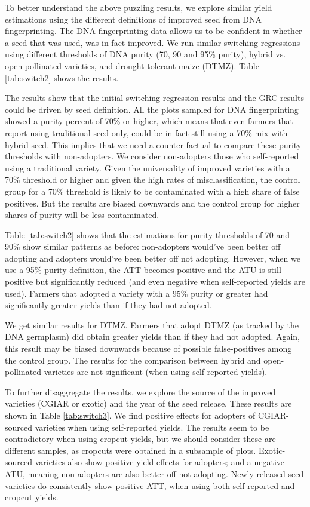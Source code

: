 \documentclass[11pt]{article}
\begin{document}


To better understand the above puzzling results, we explore similar yield estimations using the different definitions of improved seed from DNA fingerprinting. The DNA fingerprinting data allows us to be confident in whether a seed that was used, was in fact improved. We run similar switching regressions using different thresholds of DNA purity (70, 90 and 95\% purity), hybrid vs. open-pollinated varieties, and drought-tolerant maize (DTMZ). Table \ref{tab:switch2} shows the results. 

The results show that the initial switching regression results and the GRC results could be driven by seed definition. All the plots sampled for DNA fingerprinting showed a purity percent of 70\% or higher, which means that even farmers that report using traditional seed only, could be in fact still using a 70\% mix with hybrid seed. This implies that we need a counter-factual to compare these purity thresholds with non-adopters. We consider non-adopters those who self-reported using a traditional variety. Given the universality of improved varieties with a 70\% threshold or higher and given the high rates of misclassification, the control group for a 70\% threshold is likely to be contaminated with a high share of false positives. But the results are biased downwards and the control group for higher shares of purity will be less contaminated. 

Table \ref{tab:switch2} shows that the estimations for purity thresholds of 70 and 90\% show similar patterns as before: non-adopters would've been better off adopting and adopters would've been better off not adopting. However, when we use a 95\% purity definition, the ATT becomes positive and the ATU is still positive but significantly reduced (and even negative when self-reported yields are used). Farmers that adopted a variety with a 95\% purity or greater had significantly greater yields than if they had not adopted. 

We get similar results for DTMZ. Farmers that adopt DTMZ (as tracked by the DNA germplasm) did obtain greater yields than if they had not adopted. Again, this result may be biased downwards because of possible false-positives among the control group. The results for the comparison between hybrid and open-pollinated varieties are not significant (when using self-reported yields).



To further disaggregate the results, we explore the source of the improved varieties (CGIAR or exotic) and the year of the seed release. These results are shown in Table \ref{tab:switch3}. We find positive effects for adopters of CGIAR-sourced varieties when using self-reported yields. The results seem to be contradictory when using cropcut yields, but we should consider these are different samples, as cropcuts were obtained in a subsample of plots. Exotic-sourced varieties also show positive yield effects for adopters; and a negative ATU, meaning non-adopters are also better off not adopting. Newly released-seed varieties do consistently show positive ATT, when using both self-reported and cropcut yields. 
\end{document}
